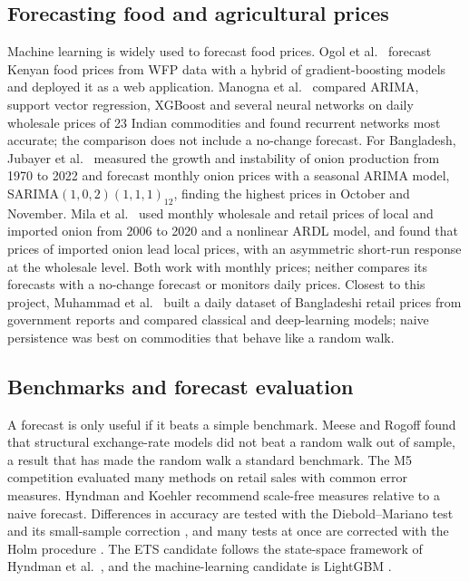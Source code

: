 \subsection{Forecasting food and agricultural prices}
Machine learning is widely used to forecast food prices. Ogol et al.\ \cite{ogol2025} forecast Kenyan food prices from WFP data with a hybrid of gradient-boosting models and deployed it as a web application. Manogna et al.\ \cite{manogna2025} compared ARIMA, support vector regression, XGBoost and several neural networks on daily wholesale prices of 23 Indian commodities and found recurrent networks most accurate; the comparison does not include a no-change forecast. For Bangladesh, Jubayer et al.\ \cite{jubayer2024} measured the growth and instability of onion production from 1970 to 2022 and forecast monthly onion prices with a seasonal ARIMA model, SARIMA$(1,0,2)(1,1,1)_{12}$, finding the highest prices in October and November. Mila et al.\ \cite{onionnardl} used monthly wholesale and retail prices of local and imported onion from 2006 to 2020 and a nonlinear ARDL model, and found that prices of imported onion lead local prices, with an asymmetric short-run response at the wholesale level. Both work with monthly prices; neither compares its forecasts with a no-change forecast or monitors daily prices. Closest to this project, Muhammad et al.\ \cite{agripricebd} built a daily dataset of Bangladeshi retail prices from government reports and compared classical and deep-learning models; naive persistence was best on commodities that behave like a random walk.

\subsection{Benchmarks and forecast evaluation}
A forecast is only useful if it beats a simple benchmark. Meese and Rogoff \cite{meese1983} found that structural exchange-rate models did not beat a random walk out of sample, a result that has made the random walk a standard benchmark. The M5 competition \cite{makridakis2022} evaluated many methods on retail sales with common error measures. Hyndman and Koehler \cite{hk2006} recommend scale-free measures relative to a naive forecast. Differences in accuracy are tested with the Diebold--Mariano test \cite{dm1995} and its small-sample correction \cite{hln1997}, and many tests at once are corrected with the Holm procedure \cite{holm1979}. The ETS candidate follows the state-space framework of Hyndman et al.\ \cite{hyndman2002}, and the machine-learning candidate is LightGBM \cite{lightgbm}.

